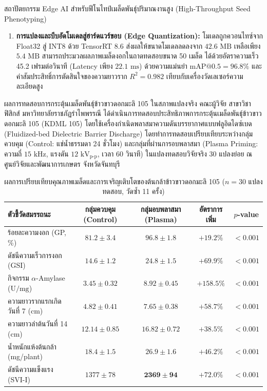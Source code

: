 \begin{aibox}{สถาปัตยกรรม Edge AI สำหรับฟีโนไทป์เมล็ดพันธุ์ปริมาณงานสูง (High-Throughput Seed Phenotyping)}
\begin{enumerate}
    \item \textbf{การแปลงและบีบอัดโมเดลสู่ฮาร์ดแวร์ขอบ (Edge Quantization):} โมเดลถูกควอนไทซ์จาก Float32 สู่ INT8 ด้วย TensorRT 8.6 ส่งผลให้ขนาดโมเดลลดลงจาก $42.6 \text{ MB}$ เหลือเพียง $5.4 \text{ MB}$ สามารถประมวลผลภาพเมล็ดงอกในถาดทดสอบขนาด 50 เมล็ด ได้ด้วยอัตราความเร็ว 45.2 เฟรมต่อวินาที (Latency เพียง $22.1 \text{ ms}$) ด้วยความแม่นยำ $\text{mAP@0.5} = 96.8\%$ และค่าสัมประสิทธิ์การตัดสินใจของความยาวราก $R^2 = 0.982$ เทียบกับเครื่องวัดเลเซอร์ความละเอียดสูง
\end{enumerate}
\end{aibox}

\begin{agribox}{ผลการทดสอบการกระตุ้นเมล็ดพันธุ์ข้าวขาวดอกมะลิ 105 ในสภาพแปลงจริง}
คณะผู้วิจัย สาขาวิชาฟิสิกส์ มหาวิทยาลัยราชภัฏรำไพพรรณี ได้ดำเนินการทดสอบประสิทธิภาพการกระตุ้นเมล็ดพันธุ์ข้าวขาวดอกมะลิ 105 (KDML 105) โดยใช้เครื่องกำเนิดพลาสมาความดันบรรยากาศแบบฟลูอิดไดซ์เบด (Fluidized-bed Dielectric Barrier Discharge) โดยทำการทดสอบเปรียบเทียบระหว่างกลุ่มควบคุม (Control: แช่น้ำธรรมดา 24 ชั่วโมง) และกลุ่มที่ผ่านการอบพลาสมา (Plasma Priming: ความถี่ $15 \text{ kHz}$, แรงดัน $12 \text{ kV}_{\text{p-p}}$, เวลา 60 วินาที) ในแปลงทดสอบวิจัยจริง 30 แปลงย่อย ณ ศูนย์วิจัยและพัฒนาการเกษตร จังหวัดจันทบุรี

\begin{table}[H]
\centering
\small
\caption{ผลการเปรียบเทียบคุณภาพเมล็ดและการเจริญเติบโตของต้นกล้าข้าวขาวดอกมะลิ 105 ($n = 30$ แปลงทดสอบ, วัดซ้ำ 11 ครั้ง)}
\label{tab:ch04_field_results}
\begin{tabular}{lcccc}
\toprule
\textbf{ตัวชี้วัดสมรรถนะ} & \textbf{กลุ่มควบคุม (Control)} & \textbf{กลุ่มอบพลาสมา (Plasma)} & \textbf{อัตราการเพิ่ม} & \textbf{$p$-value} \\
\midrule
ร้อยละความงอก (GP, \%) & $81.2 \pm 3.4$ & $\mathbf{96.8 \pm 1.8}$ & $+19.2\%$ & $<0.001$ \\
ดัชนีความเร็วการงอก (GSI) & $14.6 \pm 1.2$ & $\mathbf{24.8 \pm 1.5}$ & $+69.9\%$ & $<0.001$ \\
กิจกรรม $\alpha$-Amylase ($\text{U/mg}$) & $3.45 \pm 0.32$ & $\mathbf{8.92 \pm 0.45}$ & $+158.5\%$ & $<0.001$ \\
ความยาวรากแรกเกิดวันที่ 7 (cm) & $4.82 \pm 0.41$ & $\mathbf{7.65 \pm 0.38}$ & $+58.7\%$ & $<0.001$ \\
ความยาวลำต้นวันที่ 14 (cm) & $12.14 \pm 0.85$ & $\mathbf{16.82 \pm 0.72}$ & $+38.5\%$ & $<0.001$ \\
น้ำหนักแห้งต้นกล้า (mg/plant) & $18.4 \pm 1.5$ & $\mathbf{26.9 \pm 1.6}$ & $+46.2\%$ & $<0.001$ \\
ดัชนีความแข็งแรง (SVI-I) & $1377 \pm 78$ & $\mathbf{2369 \pm 94}$ & $+72.0\%$ & $<0.001$ \\
\bottomrule
\end{tabular}
\end{table}


\end{agribox}
